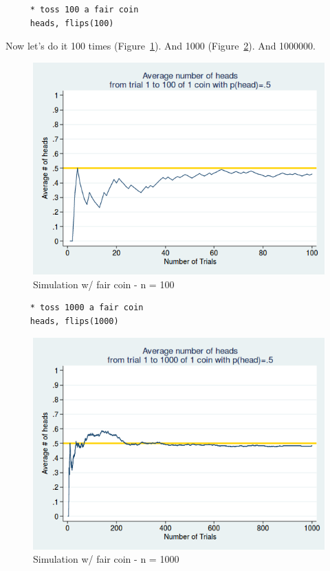 \documentclass[11pt]{article}
\begin{document}
	\begin{verbatim}
	 * toss 100 a fair coin
	 heads, flips(100)
	\end{verbatim}

	Now let's do it 100 times (Figure~\ref{f2}). And 1000 (Figure~\ref{f3}). And 1000000.\\

\begin{figure}[htp]
\centering
\includegraphics[scale=0.50]{coin_sim_100_fair.png}
\caption{Simulation w/ fair coin - n = 100}
\label{f2}
\end{figure}
	 
	\begin{verbatim}
	 * toss 1000 a fair coin
	 heads, flips(1000)
	\end{verbatim}


\begin{figure}[htp]
\centering
\includegraphics[scale=0.50]{coin_sim_1000_fair.png}
\caption{Simulation w/ fair coin - n = 1000}
\label{f3}
\end{figure}
	
\end{document}
